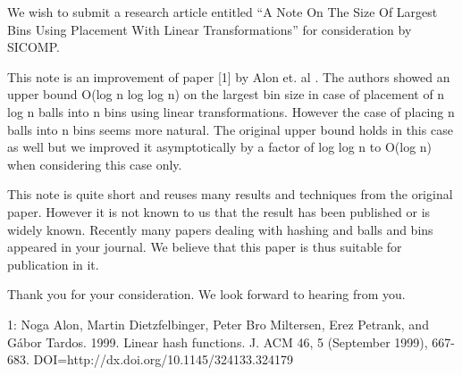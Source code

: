 \documentclass[10pt,stdletter]{newlfm}
\begin{document}
\begin{newlfm}
We wish to submit a research article entitled ``A Note On The Size Of Largest Bins Using Placement With Linear Transformations'' for consideration by SICOMP. 

This note is an improvement of paper [1] by Alon et. al . The authors showed an upper bound O(log n log log n) on the largest bin size in case of placement of n log n balls into n bins using linear transformations.
However the case of placing n balls into n bins seems more natural.
The original upper bound holds in this case as well but we improved it asymptotically by a factor of log log n to O(log n) when considering this case only.

This note is quite short and reuses many results and techniques from the original paper. However it is not known to us that the result has been published or is widely known.
Recently many papers dealing with hashing and balls and bins appeared in your journal.
We believe that this paper is thus suitable for publication in it. 

Thank you for your consideration. 
We look forward to hearing from you.

1: Noga Alon, Martin Dietzfelbinger, Peter Bro Miltersen, Erez Petrank, and Gábor Tardos. 1999. Linear hash functions. J. ACM 46, 5 (September 1999), 667-683. DOI=http://dx.doi.org/10.1145/324133.324179
\end{newlfm}
\end{document}

